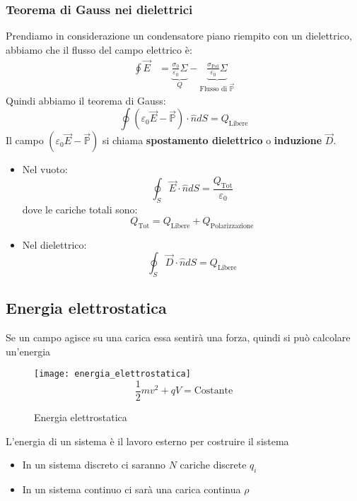 \documentclass[a4paper]{article}
\begin{document}
\subsubsection{Teorema di Gauss nei dielettrici}
Prendiamo in considerazione un condensatore piano riempito con un dielettrico, abbiamo
che il flusso del campo elettrico è:
\[
  \begin{aligned}
    \oint \vec{E} &= \underbrace{\frac{\sigma_0}{\varepsilon_0} \Sigma}_{Q} - 
    \underbrace{\frac{\sigma_{\text{Pol}}}{\varepsilon_0} \Sigma}_{\text{Flusso di } \vec{\mathbb{P}}}
  \end{aligned}
\] 
Quindi abbiamo il teorema di Gauss:
\[
  \oint \left( \varepsilon_0 \vec{E} - \vec{\mathbb{P}} \right) \cdot \hat{n} dS = Q_{\text{Libere}}
\] 
Il campo \( \left( \varepsilon_0 \vec{E} - \vec{\mathbb{P}} \right) \) si chiama 
\textbf{spostamento dielettrico} o \textbf{induzione} \( \vec{D} \).

\begin{itemize}
  \item Nel vuoto:
    \[
      \oint_S \vec{E} \cdot \hat{n} dS = \frac{Q_{\text{Tot}}}{\varepsilon_0}
    \] 
    dove le cariche totali sono:
    \[
      Q_{\text{Tot}} = Q_{\text{Libere}} + Q_{\text{Polarizzazione}}
    \] 

  \item Nel dielettrico:
    \[
      \oint_S \vec{D} \cdot \hat{n} dS = Q_{\text{Libere}}
    \] 
\end{itemize}

\subsection{Energia elettrostatica}
Se un campo agisce su una carica essa sentirà una forza, quindi si può calcolare un'energia
\begin{figure}[H]
  \centering
  \texttt{[image: energia\_elettrostatica]}
  \[
    \frac{1}{2} mv^2 + qV = \text{Costante}
  \] 
  \caption{Energia elettrostatica}
\end{figure}
\begin{definition}
  L'energia di un sistema è il lavoro esterno per costruire il sistema

  \begin{itemize}
    \item In un sistema discreto ci saranno \( N \) cariche discrete \( q_i \) 
    \item In un sistema continuo ci sarà una carica continua \( \rho \) 
  \end{itemize}
\end{definition}
\end{document}
